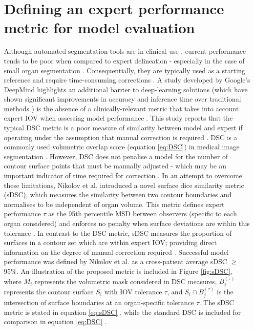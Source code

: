 \section{Defining an expert performance metric for model evaluation}
Although automated segmentation tools are in clinical use \cite{Zhu_2018},
current performance tends to be poor when compared to expert delineation -
especially in the case of small organ segmentation \cite{Nikolov_2018,
Zhu_2018}. Consequentially, they are typically used as a starting reference and
require time-consuming corrections \cite{Nikolov_2018, Nemoto_2020}. A study
developed by Google's DeepMind highlights an additional barrier to deep-learning
solutions (which have shown significant improvements in accuracy and inference
time over traditional methods \cite{Zhu_2018}) is the absence of a
clinically-relevant metric that takes into account expert IOV when assessing
model performance \cite{Nikolov_2018}. This study reports that the typical DSC
metric is a poor measure of similarity between model and expert if operating
under the assumption that manual correction is required \cite{Nikolov_2018}. DSC
is a commonly used volumetric overlap score (equation \ref{eq:DSC}) in medical
image segmentation \cite{Taha_2015}. However, DSC does not penalise a model for
the number of contour surface points that must be manually adjusted
\cite{Nikolov_2018} - which may be an important indicator of time required for
correction \cite{Nikolov_2018}. In an attempt to overcome these limitations,
Nikolov et al. introduced a novel surface dice similarity metric (sDSC), which
measures the similarity between two contour boundaries and normalises to be
independent of organ volume. This metric defines expert performance $\tau$ as
the 95th percentile MSD between observers (specific to each organ considered)
and enforces no penalty when surface deviations are within this tolerance
\cite{Nikolov_2018}. In contrast to the DSC metric, sDSC measures the proportion
of surfaces in a contour set which are within expert IOV; providing direct
information on the degree of manual correction required \cite{Nikolov_2018}.
Successful model performance was defined by Nikolov et al. as a cross-patient
average sDSC $\geq$ 95\%. An illustration of the proposed metric is included in
Figure \ref{fig:sDSC}, where $M_{i}$ represents the volumetric mask considered
in DSC measures, $B_{i}^{(\tau)}$ represents the contour surface $S_{i}$ with
IOV tolerance $\tau$, and $S_{i} \cap B_{j}^{(\tau)}$ is the intersection of
surface boundaries at an organ-specific tolerance $\tau$. The sDSC metric is
stated in equation \ref{eq:sDSC} \cite{Nemoto_2020}, while the standard DSC is
included for comparison in equation \ref{eq:DSC} \cite{Bertels2019}.

